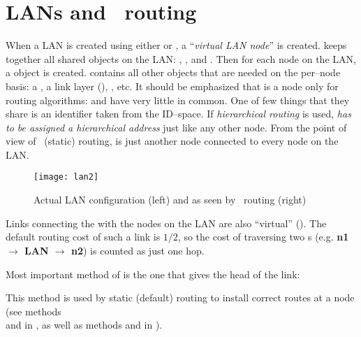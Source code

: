 \section{LANs and \ns\ routing}
\label{sec:lan_ns-routing}

When a LAN is created using either  or , a
``\textit{virtual LAN node}''  is created.
 keeps together all shared objects on the LAN:
, , and .  Then for
each node on the LAN, a  object is created.
 contains all other objects that are needed on the
per--node basis: a , a link layer (),
, etc.  It should be emphasized that  is a
node only for routing algorithms:   and  have
very little in common.  One of few things that they share is an
identifier taken from the  ID--space.  If
\textit{hierarchical routing} is used,  \textit{has to be
assigned a hierarchical address} just like any other node.  From the
point of view of \ns\ (static) routing,  is just another
node connected to every node on the LAN.
\begin{figure}[hbt]
	\centerline{\texttt{[image: lan2]}}
  	\caption{Actual LAN configuration (left) and as seen by
  	\ns\ routing (right)}
  	\label{fig:lan-routing1}
\end{figure}
Links connecting the  with the nodes on the LAN are also
``virtual'' ().  The default routing cost of such a link
is $1/2$, so the cost of traversing two s
(e.g. \textbf{n1 $\rightarrow$ LAN $\rightarrow$ n2}) is counted as just one
hop.  

Most important method of  is the one that gives the head
of the link:
This method is used by static (default) routing to install correct
routes at a  node (see  methods \\  and
 in , as well
as  methods  and  in
).  

